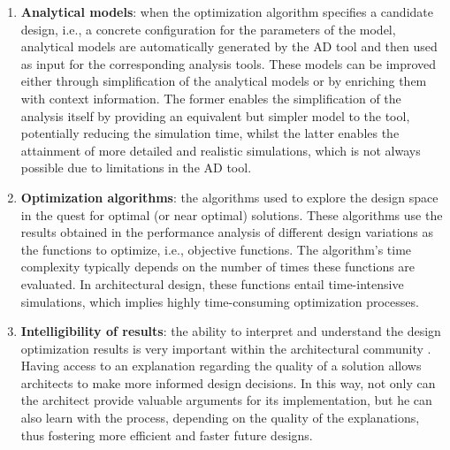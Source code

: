 \begin{enumerate}
\item \textbf{Analytical models}: when the optimization algorithm specifies a candidate design, i.e., a concrete configuration for the parameters of the model, analytical models are automatically generated by the \ac{AD} tool and then used as input for the corresponding analysis tools. These models can be improved either through simplification of the analytical models or by enriching them with context information. The former enables the simplification of the analysis itself by providing an equivalent but simpler model to the tool, potentially reducing the simulation time, whilst the latter enables the attainment of more detailed and realistic simulations, which is not always possible due to limitations in the \ac{AD} tool. 

\item \textbf{Optimization algorithms}: the algorithms used to explore the design space in the quest for optimal (or near optimal) solutions. These algorithms use the results obtained in the performance analysis of different design variations as the functions to optimize, i.e., objective functions. %
The algorithm's time complexity typically depends on the number of times these functions are evaluated. In architectural design, these functions entail time-intensive simulations, which implies highly time-consuming optimization processes.

\item \textbf{Intelligibility of results}: the ability to interpret and understand the design optimization results is very important within the architectural community \cite{Shi2016,Cichocka2017SURVEY}. Having access to an explanation regarding the quality of a solution allows architects to make more informed design decisions. In this way, not only can the architect provide valuable arguments for its implementation, but he can also learn with the process, depending on the quality of the explanations, thus fostering more efficient and faster future designs. 


\end{enumerate}
